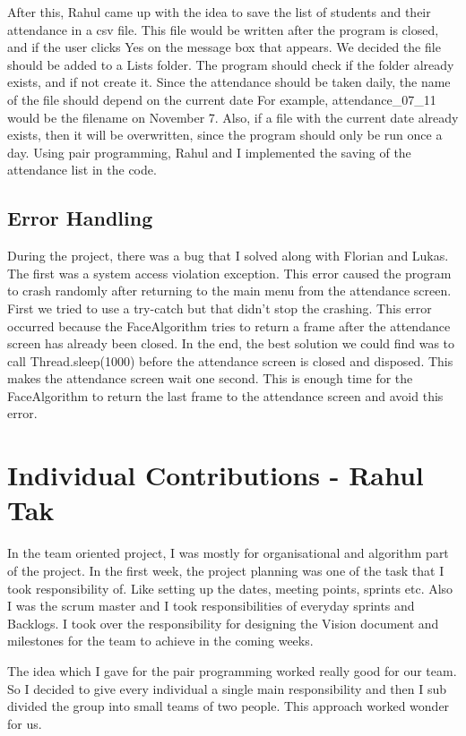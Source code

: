 \documentclass[12pt, a4paper]{article}
\begin{document}
After this, Rahul came up with the idea to save the list of students and their attendance in a csv file. This file would be written after the program is closed, and if the user clicks Yes on the message box that appears. We decided the file should be added to a Lists folder. The program should check if the folder already exists, and if not create it. Since the attendance should be taken daily, the name of the file should depend on the current date For example, attendance\_07\_11 would be the filename on November 7. Also, if a file with the current date already exists, then it will be overwritten, since the program should only be run once a day. Using pair programming, Rahul and I implemented the saving of the attendance list in the code.

\subsection{Error Handling}
During the project, there was a bug that I solved along with Florian and Lukas. The first was a system access violation exception. This error caused the program to crash randomly after returning to the main menu from the attendance screen. First we tried to use a try-catch but that didn’t stop the crashing. This error occurred because the FaceAlgorithm tries to return a frame after the attendance screen has already been closed. In the end, the best solution we could find was to call Thread.sleep(1000) before the attendance screen is closed and disposed. This makes the attendance screen wait one second. This is enough time for the FaceAlgorithm to return the last frame to the attendance screen and avoid this error.



\newpage



\section{Individual Contributions - Rahul Tak}
In the team oriented project, I was mostly for organisational and algorithm part of the project. In the first week, the project planning was one of the task that I took responsibility of. Like setting up the dates, meeting points, sprints etc. Also I was the scrum master and I took responsibilities of everyday sprints and Backlogs. I took over the responsibility for designing the Vision document and milestones for the team to achieve in the coming weeks.

The idea which I gave for the pair programming worked really good for our team. So I decided to give every individual a single main responsibility and then I sub divided the group into small teams of two people. This approach worked wonder for us. 
\end{document}
